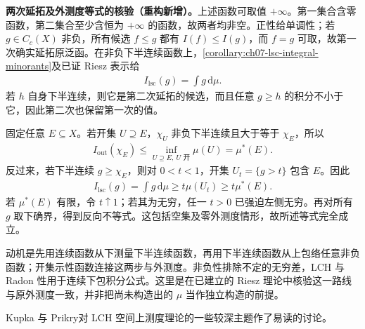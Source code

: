 \documentclass[../../main.tex]{subfiles}
\begin{document}
\begin{remark}
\textbf{两次延拓及外测度等式的核验（重构新增）。}上述函数可取值 $+\infty$。第一集合含零函数，第二集合至少含恒为 $+\infty$ 的函数，故两者均非空。正性给单调性；若 $g\in C_c(X)$ 非负，所有候选 $f\leqslant g$ 都有 $I(f)\leqslant I(g)$，而 $f=g$ 可取，故第一次确实延拓原泛函。在非负下半连续函数上，\cref{corollary:ch07-lsc-integral-minorants}及已证 Riesz 表示给
\begin{align*}
I_{\mathrm{lsc}}(g)=\int g\,\mathrm d\mu.
\end{align*}
若 $h$ 自身下半连续，则它是第二次延拓的候选，而且任意 $g\geqslant h$ 的积分不小于它，因此第二次也保留第一次的值。

固定任意 $E\subseteq X$。若开集 $U\supseteq E$，$\chi_U$ 非负下半连续且大于等于 $\chi_E$，所以
\begin{align*}
I_{\mathrm{out}}(\chi_E)\leqslant\inf_{U\supseteq E,\ U\text{ 开}}\mu(U)=\mu^*(E).
\end{align*}
反过来，若下半连续 $g\geqslant\chi_E$，则对 $0<t<1$，开集 $U_t=\{g>t\}$ 包含 $E$。因此
\begin{align*}
I_{\mathrm{lsc}}(g)=\int g\,\mathrm d\mu\geqslant t\mu(U_t)\geqslant t\mu^*(E).
\end{align*}
若 $\mu^*(E)$ 有限，令 $t\uparrow1$；若其为无穷，任一 $t>0$ 已强迫左侧无穷。再对所有 $g$ 取下确界，得到反向不等式。这包括空集及零外测度情形，故所述等式完全成立。

动机是先用连续函数从下测量下半连续函数，再用下半连续函数从上包络任意非负函数；开集示性函数连接这两步与外测度。非负性排除不定的无穷差，LCH 与 Radon 性用于连续下包积分公式。这里是在已建立的 Riesz 理论中核验这一路线与原外测度一致，并非把尚未构造出的 $\mu$ 当作独立构造的前提。
\end{remark}
Kupka 与 Prikry\cite{folland-bib-088}对 LCH 空间上测度理论的一些较深主题作了易读的讨论。

\end{document}
